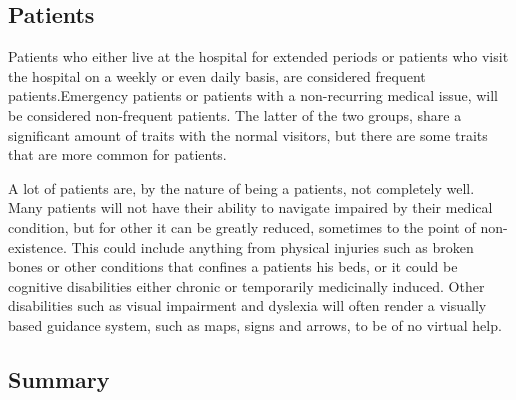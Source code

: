 
\subsection{Patients} %

Patients who either live at the hospital for extended periods or patients who visit the hospital on a weekly or even daily basis, are considered frequent patients.Emergency patients or patients with a non-recurring medical issue, will be considered non-frequent patients. The latter of the two groups, share a significant amount of traits with the normal visitors, but there are some traits that are more common for patients.

A lot of patients are, by the nature of being a patients, not completely well. Many patients will not have their ability to navigate impaired by their medical condition, but for other it can be greatly reduced, sometimes to the point of non-existence. This could include anything from physical injuries such as broken bones or other conditions that confines a patients his beds, or it could be cognitive disabilities either chronic or temporarily medicinally induced. Other disabilities such as visual impairment and dyslexia  will often render a visually based guidance system, such as maps, signs and arrows, to be of no virtual help.


\subsection{Summary}



